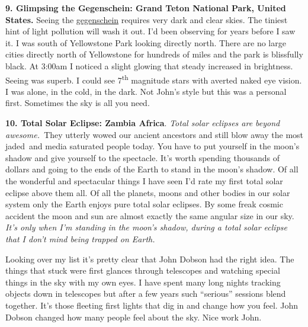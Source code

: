 \medskip

\textbf{9. Glimpsing the Gegenschein: Grand Teton National Park, United
States.} Seeing the
\href{https://en.wikipedia.org/wiki/Gegenschein}{gegenschein} requires
very dark and clear skies. The tiniest hint of light pollution will wash
it out. I'd been observing for years before I saw it. I was south of
Yellowstone Park looking directly north. There are no large cities
directly north of Yellowstone for hundreds of miles and the park is
blissfully black. At 3:00am I noticed a slight glowing that steady
increased in brightness. Seeing was superb. I could see
7\textsuperscript{th} magnitude stars with averted naked eye vision. I
was alone, in the cold, in the dark. Not John's style but this was a
personal first. Sometimes the sky is all you need.

\medskip

\textbf{10. Total Solar Eclipse: Zambia Africa}. \emph{Total solar
eclipses are beyond awesome.~}They utterly wowed our ancient ancestors
and still blow away the most jaded~and media saturated people today. You
have to put yourself in the moon's shadow and give yourself to the
spectacle. It's worth spending thousands of dollars and going to the
ends of the Earth to stand in the moon's shadow. Of all the wonderful
and spectacular things I have seen I'd rate my first total solar eclipse
above them all. Of all the planets, moons and other bodies in our solar
system only the Earth enjoys pure total solar eclipses. By some freak
cosmic accident the moon and sun are almost exactly the same angular
size in our sky. \emph{It's only when I'm standing in the moon's shadow,
during a total solar eclipse that I don't mind being trapped on Earth.}

\medskip

Looking over my list it's pretty clear that John Dobson had the right
idea. The things that stuck were first glances through telescopes and
watching special things in the sky with my own eyes. I have spent many
long nights tracking objects down in telescopes but after a few years
such ``serious'' sessions blend together. It's those fleeting first
lights that dig in and change how you feel. John Dobson changed how many
people feel about the sky. Nice work John.





%